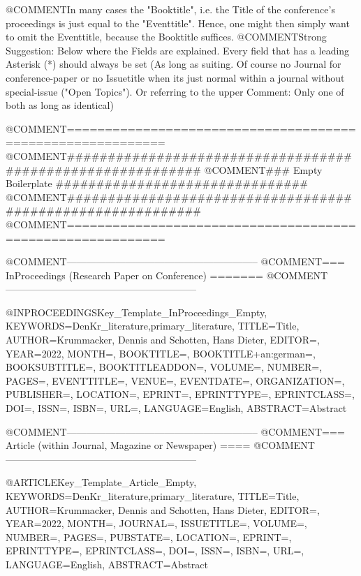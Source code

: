 
@COMMENT{In many cases the "Booktitle", i.e. the Title of the conference's proceedings is just equal to the "Eventtitle". Hence, one might then simply want to omit the Eventtitle, because the Booktitle suffices.}
@COMMENT{Strong Suggestion: Below where the Fields are explained. Every field that has a leading Asterisk (*) should always be set (As long as suiting. Of course no Journal for conference-paper or no Issuetitle when its just normal within a journal without special-issue ("Open Topics"). Or referring to the upper Comment: Only one of both as long as identical)}




@COMMENT{===========================================================}
@COMMENT{###########################################################}
@COMMENT{###    Empty Boilerplate    ###############################}
@COMMENT{###########################################################}
@COMMENT{===========================================================}


@COMMENT{-----------------------------------------------------------}
@COMMENT{===  InProceedings  (Research Paper on Conference)  =======}
@COMMENT{-----------------------------------------------------------}

@INPROCEEDINGS{Key_Template_InProceedings_Empty,
    KEYWORDS={DenKr_literature,primary_literature},
    TITLE={\begingroup
        {Title}\endgroup},
    AUTHOR={Krummacker, Dennis and Schotten, Hans Dieter},
    EDITOR={},
    YEAR={2022},
    MONTH={},
    BOOKTITLE={},
    BOOKTITLE+an:german={},
    BOOKSUBTITLE={},
    BOOKTITLEADDON={},
    VOLUME={},
    NUMBER={},
    PAGES={},
    EVENTTITLE={},
    VENUE={},
    EVENTDATE={},
    ORGANIZATION={},
    PUBLISHER={},
    LOCATION={},
    EPRINT={},
    EPRINTTYPE={},
    EPRINTCLASS={},
    DOI={},
    ISSN={},
    ISBN={},
    URL={},
    LANGUAGE={English},
    ABSTRACT={\begingroup
        {Abstract}\endgroup}
}



@COMMENT{-----------------------------------------------------------}
@COMMENT{===  Article  (within Journal, Magazine or Newspaper)  ====}
@COMMENT{-----------------------------------------------------------}

@ARTICLE{Key_Template_Article_Empty,
    KEYWORDS={DenKr_literature,primary_literature},
    TITLE={\begingroup
        {Title}\endgroup},
    AUTHOR={Krummacker, Dennis and Schotten, Hans Dieter},
    EDITOR={},
    YEAR={2022},
    MONTH={},
    JOURNAL={},
    ISSUETITLE={},
    VOLUME={},
    NUMBER={},
    PAGES={},
    PUBSTATE={},
    LOCATION={},
    EPRINT={},
    EPRINTTYPE={},
    EPRINTCLASS={},
    DOI={},
    ISSN={},
    ISBN={},
    URL={},
    LANGUAGE={English},
    ABSTRACT={\begingroup
        {Abstract}\endgroup}
}










